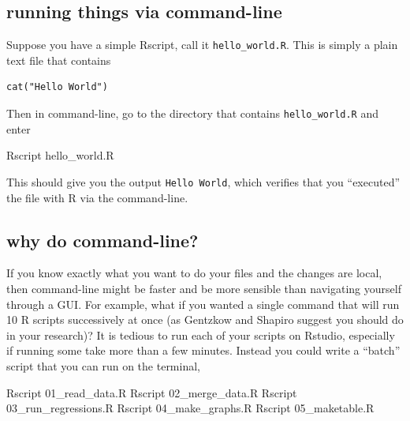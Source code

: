 \documentclass[
]{book}
\newenvironment{Shaded}{\begin{snugshade}}{\end{snugshade}}
\newcommand{\ExtensionTok}[1]{#1}
\newcommand{\NormalTok}[1]{#1}
\theoremstyle{definition}
\theoremstyle{definition}
\theoremstyle{definition}
\theoremstyle{remark}
\begin{document}
\hypertarget{running-things-via-command-line}{%
\subsection{running things via command-line}\label{running-things-via-command-line}}

Suppose you have a simple Rscript, call it \texttt{hello\_world.R}. This is simply a plain text file that contains

\begin{verbatim}
cat("Hello World")
\end{verbatim}

Then in command-line, go to the directory that contains \texttt{hello\_world.R} and enter

\begin{Shaded}
\begin{Highlighting}[]
\ExtensionTok{Rscript}\NormalTok{ hello\_world.R}
\end{Highlighting}
\end{Shaded}

This should give you the output \texttt{Hello\ World}, which verifies that you ``executed'' the file with R via the command-line.

\hypertarget{why-do-command-line}{%
\subsection{why do command-line?}\label{why-do-command-line}}

If you know exactly what you want to do your files and the changes are local, then command-line might be faster and be more sensible than navigating yourself through a GUI. For example, what if you wanted a single command that will run 10 R scripts successively at once (as Gentzkow and Shapiro suggest you should do in your research)? It is tedious to run each of your scripts on Rstudio, especially if running some take more than a few minutes. Instead you could write a ``batch'' script that you can run on the terminal,

\begin{Shaded}
\begin{Highlighting}[]
\ExtensionTok{Rscript}\NormalTok{ 01\_read\_data.R}
\ExtensionTok{Rscript}\NormalTok{ 02\_merge\_data.R}
\ExtensionTok{Rscript}\NormalTok{ 03\_run\_regressions.R}
\ExtensionTok{Rscript}\NormalTok{ 04\_make\_graphs.R}
\ExtensionTok{Rscript}\NormalTok{ 05\_maketable.R}
\end{Highlighting}
\end{Shaded}
\end{document}
